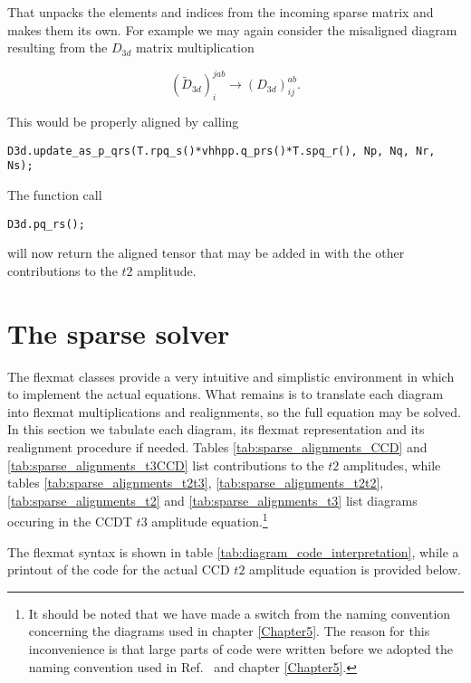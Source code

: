 That unpacks the elements and indices from the incoming sparse matrix and makes them its own. For example we may again consider the misaligned diagram resulting from the $D_{3d}$ matrix multiplication

\begin{equation}
 (\tilde{D}_{3d})^{jab}_{i} \rightarrow (D_{3d})^{ab}_{ij}.
\end{equation}

This would be properly aligned by calling

\begin{verbatim}
D3d.update_as_p_qrs(T.rpq_s()*vhhpp.q_prs()*T.spq_r(), Np, Nq, Nr, Ns);
\end{verbatim}

The function call

\begin{verbatim}
D3d.pq_rs();
\end{verbatim}

will now return the aligned tensor that may be added in with the other contributions to the $t2$ amplitude.

\FloatBarrier

\section{The sparse solver}

The flexmat classes provide a very intuitive and simplistic environment in which to implement the actual equations. What remains is to translate each diagram into flexmat multiplications and realignments, so the full equation may be solved. In this section we tabulate each diagram, its flexmat representation and its realignment procedure if needed. Tables \ref{tab:sparse_alignments_CCD} and \ref{tab:sparse_alignments_t3CCD} list contributions to the $t2$ amplitudes, while tables \ref{tab:sparse_alignments_t2t3}, \ref{tab:sparse_alignments_t2t2}, \ref{tab:sparse_alignments_t2} and \ref{tab:sparse_alignments_t3} list diagrams occuring in the CCDT $t3$ amplitude equation.\footnote{It should be noted that we have made a switch from the naming convention concerning the diagrams used in chapter \ref{Chapter5}. The reason for this inconvenience is that large parts of code were written before we adopted the naming convention used in Ref.~\cite{ShavittBartlett2009} and chapter \ref{Chapter5}.}

\FloatBarrier
\clearpage

The flexmat syntax is shown in table \ref{tab:diagram_code_interpretation}, while a printout of the code for the actual CCD $t2$ amplitude equation is provided below. 

